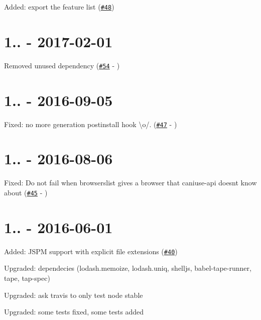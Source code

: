 
\begin{DoxyItemize}
\item Added\+: export the feature list (\href{https://github.com/Nyalab/caniuse-api/pull/48}{\tt \#48})
\end{DoxyItemize}

\section*{1.. -\/ 2017-\/02-\/01}


\begin{DoxyItemize}
\item Removed unused dependency (\href{https://github.com/Nyalab/caniuse-api/pull/54}{\tt \#54} -\/ )
\end{DoxyItemize}

\section*{1.. -\/ 2016-\/09-\/05}


\begin{DoxyItemize}
\item Fixed\+: no more generation {\ttfamily postinstall} hook {\ttfamily \textbackslash{}o/}. (\href{https://github.com/Nyalab/caniuse-api/pull/47}{\tt \#47} -\/ )
\end{DoxyItemize}

\section*{1.. -\/ 2016-\/08-\/06}


\begin{DoxyItemize}
\item Fixed\+: Do not fail when browserslist gives a browser that caniuse-\/api doesn\textquotesingle{}t know about (\href{https://github.com/Nyalab/caniuse-api/pull/45}{\tt \#45} -\/ )
\end{DoxyItemize}

\section*{1.. -\/ 2016-\/06-\/01}


\begin{DoxyItemize}
\item Added\+: J\+S\+PM support with explicit file extensions (\href{https://github.com/Nyalab/caniuse-api/issues/40}{\tt \#40})
\item Upgraded\+: dependecies (lodash.\+memoize, lodash.\+uniq, shelljs, babel-\/tape-\/runner, tape, tap-\/spec)
\item Upgraded\+: ask travis to only test node stable
\item Upgraded\+: some tests fixed, some tests added
\end{DoxyItemize}

